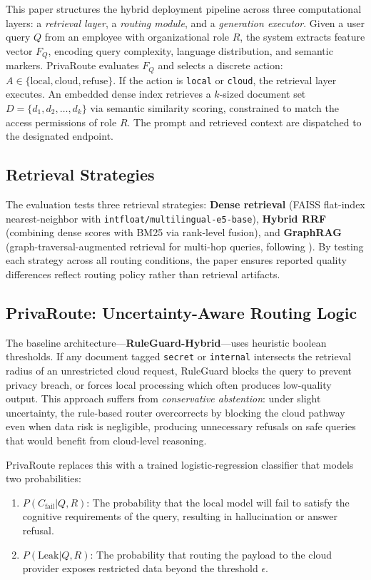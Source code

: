 \documentclass{article}
\newcommand{\code}[1]{{\small\texttt{#1}}}
\begin{document}
This paper structures the hybrid deployment pipeline across three computational layers: a \textit{retrieval layer}, a \textit{routing module}, and a \textit{generation executor}. Given a user query $Q$ from an employee with organizational role $R$, the system extracts feature vector $F_{Q}$, encoding query complexity, language distribution, and semantic markers. PrivaRoute evaluates $F_{Q}$ and selects a discrete action: $A \in \{\text{local}, \text{cloud}, \text{refuse}\}$. If the action is \code{local} or \code{cloud}, the retrieval layer executes. An embedded dense index retrieves a $k$-sized document set $D = \{d_1, d_2, \dots, d_k\}$ via semantic similarity scoring, constrained to match the access permissions of role $R$. The prompt and retrieved context are dispatched to the designated endpoint.

\subsection{Retrieval Strategies}
The evaluation tests three retrieval strategies: \textbf{Dense retrieval} (FAISS flat-index nearest-neighbor with \code{intfloat/multilingual-e5-base}), \textbf{Hybrid RRF} (combining dense scores with BM25 via rank-level fusion), and \textbf{GraphRAG} (graph-traversal-augmented retrieval for multi-hop queries, following \cite{edge2024localglobal}). By testing each strategy across all routing conditions, the paper ensures reported quality differences reflect routing policy rather than retrieval artifacts.

\subsection{PrivaRoute: Uncertainty-Aware Routing Logic}
The baseline architecture---\textbf{RuleGuard-Hybrid}---uses heuristic boolean thresholds. If any document tagged \code{secret} or \code{internal} intersects the retrieval radius of an unrestricted cloud request, RuleGuard blocks the query to prevent privacy breach, or forces local processing which often produces low-quality output. This approach suffers from \emph{conservative abstention}: under slight uncertainty, the rule-based router overcorrects by blocking the cloud pathway even when data risk is negligible, producing unnecessary refusals on safe queries that would benefit from cloud-level reasoning.

PrivaRoute replaces this with a trained logistic-regression classifier that models two probabilities:
\begin{enumerate}
    \item $P(C_{\text{fail}} | Q, R)$: The probability that the local model will fail to satisfy the cognitive requirements of the query, resulting in hallucination or answer refusal.
    \item $P(\text{Leak} | Q, R)$: The probability that routing the payload to the cloud provider exposes restricted data beyond the threshold $\epsilon$.
\end{enumerate}
\end{document}
